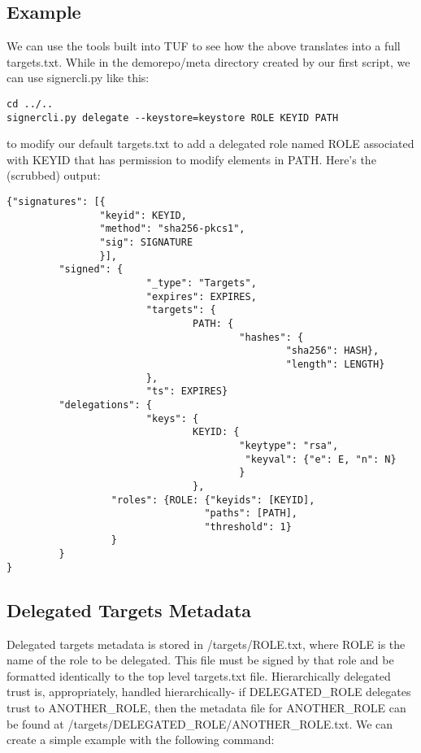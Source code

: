 \documentclass{article}
\begin{document}
\subsection{Example}
We can use the tools built into TUF to see how the above translates into a full 
targets.txt. While in the demorepo/meta directory created by our first script, we can
use signercli.py like this:
\begin{lstlisting}
cd ../..
signercli.py delegate --keystore=keystore ROLE KEYID PATH
\end{lstlisting}
to modify our default targets.txt to add a delegated role named ROLE associated
with KEYID that has permission to modify elements in PATH. Here's the (scrubbed)
output:

\begin{verbatim}
{"signatures": [{
                "keyid": KEYID, 
                "method": "sha256-pkcs1", 
                "sig": SIGNATURE
                }], 
         "signed": {
                        "_type": "Targets", 
                        "expires": EXPIRES, 
                        "targets": {
                                PATH: {
                                        "hashes": {
                                                "sha256": HASH}, 
                                                "length": LENGTH}
                        }, 
                        "ts": EXPIRES}
         "delegations": {
                        "keys": {
                                KEYID: {
                                        "keytype": "rsa",
                                         "keyval": {"e": E, "n": N}
                                        }
                                }, 
                  "roles": {ROLE: {"keyids": [KEYID], 
                                  "paths": [PATH], 
                                  "threshold": 1}
                  }
         }
}
\end{verbatim}

\subsection{Delegated Targets Metadata}
Delegated targets metadata is stored in /targets/ROLE.txt, where ROLE is the
name of the role to be delegated. This file must be signed by that role and
be formatted identically to the top level targets.txt file. Hierarchically
delegated trust is, appropriately, handled hierarchically- if DELEGATED\_ROLE
delegates trust to ANOTHER\_ROLE, then the metadata file for ANOTHER\_ROLE can be
found at /targets/DELEGATED\_ROLE/ANOTHER\_ROLE.txt. We can create a simple
example with the following command:
\end{document}
